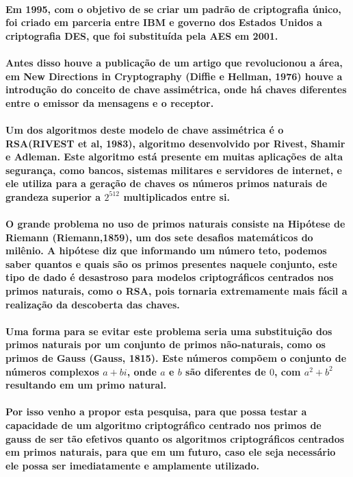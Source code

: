 \documentclass{article}
\begin{document}
	\paragraph{
		Em 1995, com o objetivo de se criar um padrão de criptografia único, foi criado em parceria entre IBM e governo dos Estados Unidos a criptografia DES, que foi substituída pela AES em 2001. 
	}
	\paragraph{
		Antes disso houve a publicação de um artigo que revolucionou a área, em New Directions in Cryptography (Diffie e Hellman, 1976) houve a introdução do conceito de chave assimétrica, onde há chaves diferentes entre o emissor da mensagens e o receptor.
	}
	\paragraph{
		Um dos algoritmos deste modelo de chave assimétrica é o RSA(RIVEST et al, 1983), algoritmo  desenvolvido por Rivest, Shamir e Adleman. Este algoritmo está presente em muitas aplicações de alta segurança, como bancos, sistemas militares e servidores de internet, e ele utiliza para a geração de chaves os números primos naturais de grandeza superior a $2^{512}$ multiplicados entre si.
	}
	\paragraph{
		O grande problema no uso de primos naturais consiste na Hipótese de Riemann (Riemann,1859), um dos sete desafios matemáticos do milênio. A hipótese diz que informando um número teto, podemos saber quantos e quais são os primos presentes naquele conjunto, este tipo de dado é desastroso para modelos criptográficos centrados nos primos naturais, como o RSA, pois tornaria extremamente mais fácil a realização da descoberta das chaves.
	}
	\paragraph{
		Uma forma para se evitar este problema seria uma substituição dos primos naturais por um conjunto de primos não-naturais, como os primos de Gauss (Gauss, 1815). Este números compõem o conjunto de números complexos $a+bi$, onde $a$ e $b$ são diferentes de $0$, com $a^2+b^2$ resultando em um primo natural.
	}
	\paragraph{
		Por isso venho a propor esta pesquisa, para que possa testar a capacidade de um algoritmo criptográfico centrado nos primos de gauss de ser tão efetivos quanto os algoritmos criptográficos centrados em primos naturais, para que em um futuro, caso ele seja necessário ele possa ser imediatamente e amplamente utilizado.
	}
\end{document}
